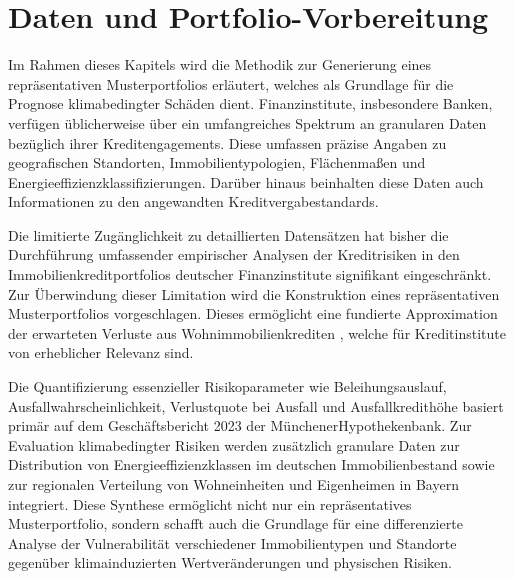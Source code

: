 \section{Daten und Portfolio-Vorbereitung}

Im Rahmen dieses Kapitels wird die Methodik zur Generierung eines repräsentativen Musterportfolios erläutert, welches als Grundlage für die Prognose klimabedingter Schäden dient. Finanzinstitute, insbesondere Banken, verfügen üblicherweise über ein umfangreiches Spektrum an granularen Daten bezüglich ihrer Kreditengagements. Diese umfassen präzise Angaben zu geografischen Standorten, Immobilientypologien, Flächenmaßen und Energieeffizienzklassifizierungen. Darüber hinaus beinhalten diese Daten auch Informationen zu den angewandten Kreditvergabestandards.

Die limitierte Zugänglichkeit zu detaillierten Datensätzen hat bisher die Durchführung umfassender empirischer Analysen der Kreditrisiken in den Immobilienkreditportfolios deutscher Finanzinstitute signifikant eingeschränkt. Zur Überwindung dieser Limitation wird die Konstruktion eines repräsentativen Musterportfolios vorgeschlagen. Dieses ermöglicht eine fundierte Approximation der erwarteten Verluste aus Wohnimmobilienkrediten , welche für Kreditinstitute von erheblicher Relevanz sind.

Die Quantifizierung essenzieller Risikoparameter wie Beleihungsauslauf, Ausfallwahrscheinlichkeit, Verlustquote bei Ausfall und Ausfallkredithöhe basiert primär auf dem Geschäftsbericht 2023 der MünchenerHypothekenbank. Zur Evaluation klimabedingter Risiken werden zusätzlich granulare Daten zur Distribution von Energieeffizienzklassen im deutschen Immobilienbestand sowie zur regionalen Verteilung von Wohneinheiten und Eigenheimen in Bayern integriert. Diese Synthese ermöglicht nicht nur ein repräsentatives Musterportfolio, sondern schafft auch die Grundlage für eine differenzierte Analyse der Vulnerabilität verschiedener Immobilientypen und Standorte gegenüber klimainduzierten Wertveränderungen und physischen Risiken.